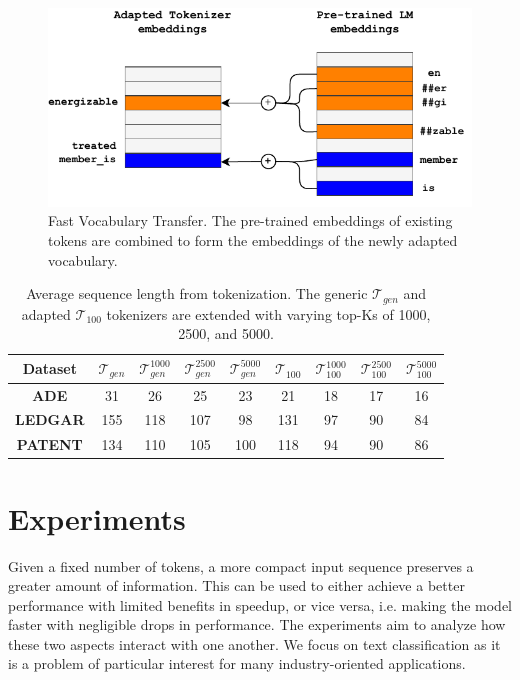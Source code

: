 \documentclass[11pt]{article}
\newcommand{\az}[1]{\color{black} #1}
\def\tokgen{\mathcal{T}_{gen}}
\def\tok100{\mathcal{T}_{100}}
\begin{document}
\begin{figure}
    \centering
    \includegraphics[scale=0.7]{images/fvt.pdf}
    \caption{Fast Vocabulary Transfer. The pre-trained embeddings of existing tokens are combined to form the embeddings of the newly adapted vocabulary.}
    \label{figure:fvt_sketch}
\end{figure}

\renewcommand{\arraystretch}{1.3}
\begin{table}[ht]
    \centering
    \begin{tabular}{ccccccccc}
        \hline
        \textbf{Dataset}    & $\tokgen$     & $\tokgen^{1000}$  & $\tokgen^{2500}$  & $\tokgen^{5000}$  & $\tok100$     & $\tok100^{1000}$  & $\tok100^{2500}$  & $\tok100^{5000}$  \\
        \hline
        \textbf{ADE}    & 31    & 26    & 25    & 23    & 21    & 18    & 17    & 16    \\
        \textbf{LEDGAR} & 155   & 118   & 107   & 98    & 131   & 97    & 90    & 84    \\
        \textbf{PATENT} & 134   & 110   & 105   & 100   & 118   & 94    & 90    & 86    \\ 
        \hline
    \end{tabular}
    \caption{Average sequence length from tokenization. The generic $\tokgen$ and adapted $\tok100$ tokenizers are extended with varying top-Ks of 1000, 2500, and 5000.}
    \label{table:seq_len}
\end{table}



\section{Experiments}\label{section:experiments}
Given a fixed number of tokens, a more compact input sequence preserves a greater amount of information. This can be used to either achieve a better performance with limited benefits in speedup, or vice versa, i.e. making the model faster with negligible drops in performance. The experiments aim to analyze how these two aspects interact with one another. {\az We focus on text classification as it is a problem of particular interest for many industry-oriented applications.}
\end{document}
